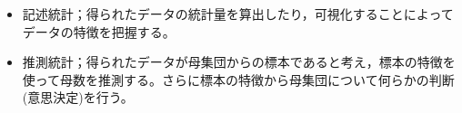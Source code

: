 \begin{itemize}
	\item 記述統計；得られたデータの統計量を算出したり，可視化することによってデータの特徴を把握する。
	\item 推測統計；得られたデータが母集団からの標本であると考え，標本の特徴を使って母数を推測する。さらに標本の特徴から母集団について何らかの判断(意思決定)を行う。
\end{itemize}
